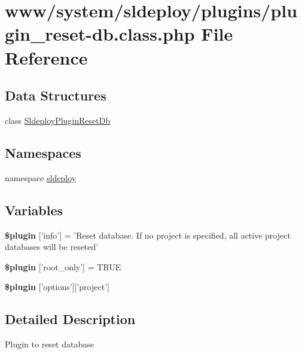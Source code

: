 \hypertarget{plugin__reset-db_8class_8php}{
\section{www/system/sldeploy/plugins/plugin\_\-reset-\/db.class.php File Reference}
\label{plugin__reset-db_8class_8php}
}
\subsection*{Data Structures}
\begin{DoxyCompactItemize}
\item 
class \hyperlink{class_sldeploy_plugin_reset_db}{SldeployPluginResetDb}
\end{DoxyCompactItemize}
\subsection*{Namespaces}
\begin{DoxyCompactItemize}
\item 
namespace \hyperlink{namespacesldeploy}{sldeploy}
\end{DoxyCompactItemize}
\subsection*{Variables}
\begin{DoxyCompactItemize}
\item 
\hypertarget{plugin__reset-db_8class_8php_a95edf69ebbeaeedb03bab3bb010f2af9}{
{\bfseries \$plugin} \mbox{[}'info'\mbox{]} = 'Reset database. If no project is specified, all active project databases will be reseted'}
\label{plugin__reset-db_8class_8php_a95edf69ebbeaeedb03bab3bb010f2af9}

\item 
\hypertarget{plugin__reset-db_8class_8php_a1d302084fa15e3efe6c843cbb5096985}{
{\bfseries \$plugin} \mbox{[}'root\_\-only'\mbox{]} = TRUE}
\label{plugin__reset-db_8class_8php_a1d302084fa15e3efe6c843cbb5096985}

\item 
{\bfseries \$plugin} \mbox{[}'options'\mbox{]}\mbox{[}'project'\mbox{]}
\end{DoxyCompactItemize}


\subsection{Detailed Description}
Plugin to reset database


